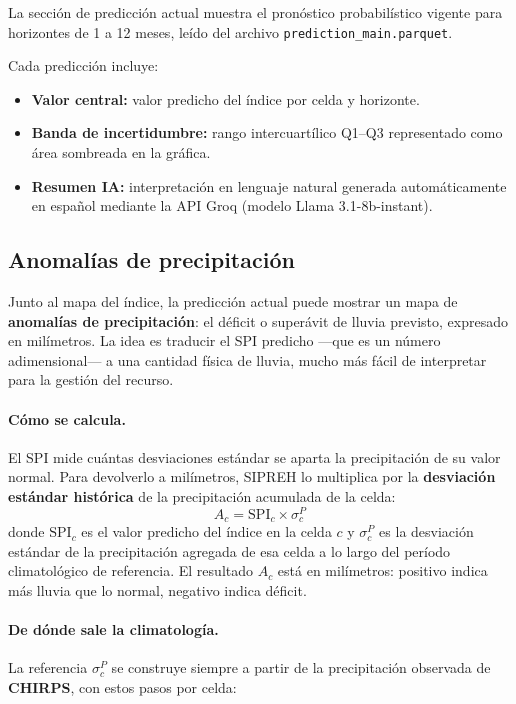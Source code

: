 La sección de predicción actual muestra el pronóstico probabilístico vigente para horizontes de 1 a 12 meses, leído del archivo \texttt{prediction\_main.parquet}.

Cada predicción incluye:
\begin{itemize}
    \item \textbf{Valor central:} valor predicho del índice por celda y horizonte.
    \item \textbf{Banda de incertidumbre:} rango intercuartílico Q1--Q3 representado como área sombreada en la gráfica.
    \item \textbf{Resumen IA:} interpretación en lenguaje natural generada automáticamente en español mediante la API Groq (modelo Llama 3.1-8b-instant).
\end{itemize}

\subsection*{Anomalías de precipitación}

Junto al mapa del índice, la predicción actual puede mostrar un mapa de \textbf{anomalías de precipitación}: el déficit o superávit de lluvia previsto, expresado en milímetros. La idea es traducir el SPI predicho ---que es un número adimensional--- a una cantidad física de lluvia, mucho más fácil de interpretar para la gestión del recurso.

\paragraph{Cómo se calcula.} El SPI mide cuántas desviaciones estándar se aparta la precipitación de su valor normal. Para devolverlo a milímetros, SIPREH lo multiplica por la \textbf{desviación estándar histórica} de la precipitación acumulada de la celda:
\[
A_{c} = \mathrm{SPI}_{c} \times \sigma^{P}_{c}
\]
donde $\mathrm{SPI}_{c}$ es el valor predicho del índice en la celda $c$ y $\sigma^{P}_{c}$ es la desviación estándar de la precipitación agregada de esa celda a lo largo del período climatológico de referencia. El resultado $A_c$ está en milímetros: positivo indica más lluvia que lo normal, negativo indica déficit.

\paragraph{De dónde sale la climatología.} La referencia $\sigma^{P}_{c}$ se construye siempre a partir de la precipitación observada de \textbf{CHIRPS}, con estos pasos por celda:

